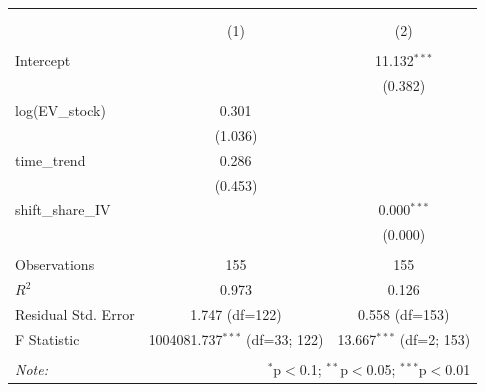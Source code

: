 \begin{table}[!htbp] \centering
\begin{tabular}{@{\extracolsep{5pt}}lcc}
\\[-1.8ex]\hline
\hline \\[-1.8ex]
\\[-1.8ex] & (1) & (2) \\
\hline \\[-1.8ex]
 Intercept & & 11.132$^{***}$ \\
& & (0.382) \\
 log(EV_stock) & 0.301$^{}$ & \\
& (1.036) & \\
 time_trend & 0.286$^{}$ & \\
& (0.453) & \\
 shift_share_IV & & 0.000$^{***}$ \\
& & (0.000) \\
\hline \\[-1.8ex]
 Observations & 155 & 155 \\
 $R^2$ & 0.973 & 0.126 \\
 Residual Std. Error & 1.747 (df=122) & 0.558 (df=153) \\
 F Statistic & 1004081.737$^{***}$ (df=33; 122) & 13.667$^{***}$ (df=2; 153) \\
\hline
\hline \\[-1.8ex]
\textit{Note:} & \multicolumn{2}{r}{$^{*}$p$<$0.1; $^{**}$p$<$0.05; $^{***}$p$<$0.01} \\
\end{tabular}
\end{table}